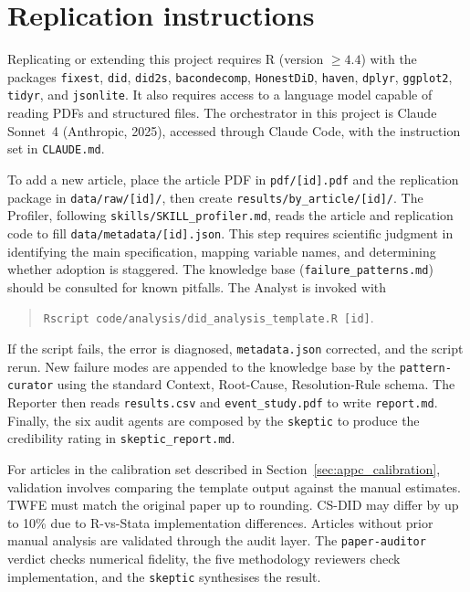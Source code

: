 \section{Replication instructions}
\label{sec:appc_replication}

Replicating or extending this project requires R (version $\geq 4.4$) with the packages \texttt{fixest}, \texttt{did}, \texttt{did2s}, \texttt{bacondecomp}, \texttt{HonestDiD}, \texttt{haven}, \texttt{dplyr}, \texttt{ggplot2}, \texttt{tidyr}, and \texttt{jsonlite}. It also requires access to a language model capable of reading PDFs and structured files. The orchestrator in this project is Claude Sonnet~4 (Anthropic, 2025), accessed through Claude Code, with the instruction set in \texttt{CLAUDE.md}.

To add a new article, place the article PDF in \texttt{pdf/[id].pdf} and the replication package in \texttt{data/raw/[id]/}, then create \texttt{results/by\_article/[id]/}. The Profiler, following \texttt{skills/SKILL\_profiler.md}, reads the article and replication code to fill \texttt{data/metadata/[id].json}. This step requires scientific judgment in identifying the main specification, mapping variable names, and determining whether adoption is staggered. The knowledge base (\texttt{failure\_patterns.md}) should be consulted for known pitfalls. The Analyst is invoked with
\begin{quote}
\texttt{Rscript code/analysis/did\_analysis\_template.R [id]}.
\end{quote}
If the script fails, the error is diagnosed, \texttt{metadata.json} corrected, and the script rerun. New failure modes are appended to the knowledge base by the \texttt{pattern-curator} using the standard Context, Root-Cause, Resolution-Rule schema. The Reporter then reads \texttt{results.csv} and \texttt{event\_study.pdf} to write \texttt{report.md}. Finally, the six audit agents are composed by the \texttt{skeptic} to produce the credibility rating in \texttt{skeptic\_report.md}.

For articles in the calibration set described in Section~\ref{sec:appc_calibration}, validation involves comparing the template output against the manual estimates. TWFE must match the original paper up to rounding. CS-DID may differ by up to 10\% due to R-vs-Stata implementation differences. Articles without prior manual analysis are validated through the audit layer. The \texttt{paper-auditor} verdict checks numerical fidelity, the five methodology reviewers check implementation, and the \texttt{skeptic} synthesises the result.
